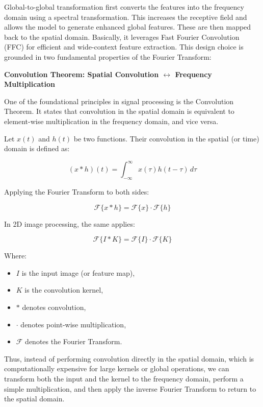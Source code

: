 Global-to-global transformation first converts the features into the frequency domain using a spectral transformation. This increases the receptive field and allows the model to generate enhanced global features. These are then mapped back to the spatial domain. Basically, it leverages Fast Fourier Convolution (FFC) for efficient and wide-context feature extraction. This design choice is grounded in two fundamental properties of the Fourier Transform:

\textbf{Convolution Theorem: Spatial Convolution $\leftrightarrow$ Frequency Multiplication}

One of the foundational principles in signal processing is the Convolution Theorem. It states that convolution in the spatial domain is equivalent to element-wise multiplication in the frequency domain, and vice versa.

Let $x(t)$ and $h(t)$ be two functions. Their convolution in the spatial (or time) domain is defined as:

\begin{equation}
(x * h)(t) = \int_{-\infty}^{\infty} x(\tau) h(t - \tau) \, d\tau
\end{equation}

Applying the Fourier Transform to both sides:

\begin{equation}
\mathcal{F}\{x * h\} = \mathcal{F}\{x\} \cdot \mathcal{F}\{h\}
\end{equation}

In 2D image processing, the same applies:

\begin{equation}
\mathcal{F}\{I * K\} = \mathcal{F}\{I\} \cdot \mathcal{F}\{K\}
\end{equation}

Where:
\begin{itemize}
    \item $I$ is the input image (or feature map),
    \item $K$ is the convolution kernel,
    \item $*$ denotes convolution,
    \item $\cdot$ denotes point-wise multiplication,
    \item $\mathcal{F}$ denotes the Fourier Transform.
\end{itemize}

Thus, instead of performing convolution directly in the spatial domain, which is computationally expensive for large kernels or global operations, we can transform both the input and the kernel to the frequency domain, perform a simple multiplication, and then apply the inverse Fourier Transform to return to the spatial domain.


